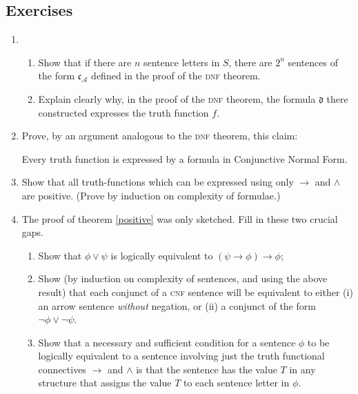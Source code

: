 {\small

\subsection*{Exercises}

\begin{enumerate}
\item \begin{enumerate}
	
	\item Show that if there are $n$ sentence letters in $S$, there are $2^{n}$ sentences of the form $\mathfrak{c}_{\mathscr{A}}$ defined in the proof of the \textsc{\lowercase{DNF}} theorem.
\item Explain clearly why, in the proof of the \textsc{\lowercase{DNF}} theorem, the formula $\mathfrak{d}$ there constructed expresses the truth function $f$.
\end{enumerate}
\item  Prove, by an argument analogous to the \textsc{\lowercase{DNF}} theorem, this claim: \begin{theorem} 	Every truth function is expressed by a formula in Conjunctive Normal Form.\end{theorem}
\item Show that  all truth-functions which can be expressed using only $\to$ and $\wedge$ are positive. (Prove by induction on complexity of formulae.)

\item The proof of theorem \ref{positive} was only sketched. Fill in these two crucial gaps.\begin{enumerate} 
	\item Show that $\phi\vee \psi$ is logically equivalent to $(\psi \to \phi)\to \phi$;
	\item Show (by induction on complexity of sentences, and using the above result) that each conjunct of a \textsc{\lowercase{CNF}} sentence will be equivalent to either (i) an arrow sentence \emph{without} negation, or (ii)  a conjunct  of the form $\neg \phi \vee \neg \psi$.
		\item	 Show that a necessary and sufficient condition for a sentence $\phi$
	 to be logically equivalent to a sentence involving just the truth functional connectives $\to$ and 
	$\wedge$ is that the sentence has the value $T$ in any structure that assigns the
		    value $T$ to each sentence letter in $\phi$. \end{enumerate}


\end{enumerate}}
